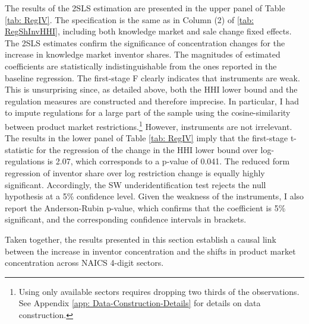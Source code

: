 The results of the 2SLS estimation are presented in the upper panel
of Table \ref{tab: RegIV}. The specification is the same as in Column
(2) of \ref{tab: RegShInvHHI}, including both knowledge market and
sale change fixed effects. The 2SLS estimates confirm the significance
of concentration changes for the increase in knowledge market inventor
shares. The magnitudes of estimated coefficients are statistically
indistinguishable from the ones reported in the baseline regression.
The first-stage F clearly indicates that instruments are weak. This
is unsurprising since, as detailed above, both the HHI lower bound
and the regulation measures are constructed and therefore imprecise.
In particular, I had to impute regulations for a large part of the
sample using the cosine-similarity between product market restrictions.\footnote{Using only available sectors requires dropping two thirds of the observations.
See Appendix \ref{app: Data-Construction-Details} for details on
data construction. } However, instruments are not irrelevant. The results in the lower
panel of Table \ref{tab: RegIV} imply that the first-stage t-statistic
for the regression of the change in the HHI lower bound over log-regulations
is 2.07, which corresponds to a p-value of 0.041. The reduced form
regression of inventor share over log restriction change is equally
highly significant. Accordingly, the SW underidentification test rejects
the null hypothesis at a 5\% confidence level. Given the weakness
of the instruments, I also report the Anderson-Rubin p-value, which
confirms that the coefficient is 5\% significant, and the corresponding
confidence intervals in brackets.

Taken together, the results presented in this section establish a
causal link between the increase in inventor concentration and the
shifts in product market concentration across NAICS 4-digit sectors.

